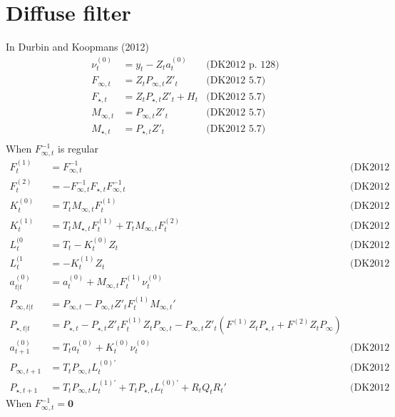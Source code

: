 \documentclass{article}
\begin{document}
\section{Diffuse filter}
In Durbin and Koopmans (2012)
\begin{align*}
  \nu^{(0)}_t &= y_t - Z_t a^{(0)}_t & \mbox{(DK2012 p. 128)}\\
  F_{\infty,t} &= Z_tP_{\infty,t}Z'_t & \mbox{(DK2012 5.7)}\\
  F_{\star,t} &= Z_tP_{\star,t}Z'_t + H_t & \mbox{(DK2012 5.7)}\\
  M_{\infty,t } &= P_{\infty,t}Z'_t & \mbox{(DK2012 5.7)}\\
  M_{\star,t } &= P_{\star,t}Z'_t & \mbox{(DK2012 5.7)}\\
\end{align*}
When $F^{-1}_{\infty,t}$ is regular
\begin{align*}
  F^{(1)}_t &= F^{-1}_{\infty, t} & \mbox{(DK2012 5.10)}\\
  F^{(2)}_t &=  -F^{-1}_{\infty, t}F_{\star, t}F^{-1}_{\infty, t} & \mbox{(DK2012 5.10)}\\
  K^{(0)}_t &= T_tM_{\infty,t}F^{(1)}_t & \mbox{(DK2012 5.12)}\\
  K^{(1)}_t &= T_tM_{\star,t}F^{(1)}_t + T_tM_{\infty,t}F^{(2)}_t &
                                                                    \mbox{(DK2012 5.12)}\\
  L^{(0}_t &= T_t - K^{(0)}_tZ_t & \mbox{(DK2012 5.12)}\\
  L^{(1}_t &= - K^{(1)}_tZ_t & \mbox{(DK2012 5.12)}\\
  a^{(0)}_{t|t} &= a^{(0)}_t + M_{\infty,t}F^{(1)}_t\nu^{(0)}_t\\
  P_{\infty,t|t} &= P_{\infty,t} - P_{\infty,t}Z'_tF^{(1)}_tM_{\infty,t}' \\
  P_{\star,t|t} &= P_{\star,t} - P_{\star,t}Z'_t
                  F^{(1)}_tZ_tP_{\infty,t} -
                  P_{\infty,t}Z'_t(F^{(1)}Z_tP_{\star,t} + F^{(2)}Z_tP_{\infty})\\
  a^{(0)}_{t+1} &= T_ta^{(0)}_t + K^{(0)}_t\nu^{(0)}_t & \mbox{(DK2012 5.13)}\\
  P_{\infty,t+ 1} &= T_tP_{\infty,t}L^{(0)'}_t & \mbox{(DK2012 5.14)}\\
  P_{\star, t+1} &= T_tP_{\infty,t}L^{(1)'}_t + T_tP_{\star,t}L^{(0)'}_t + R_tQ_tR_t' & \mbox{(DK2012 5.14)}
\end{align*}
When $F^{-1}_{\infty,t} = \mathbf{0}$
\end{document}
